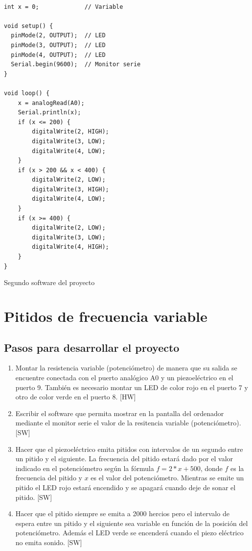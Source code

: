 \documentclass[11pt,spanish,a4paper]{article}
\begin{document}
\begin{listing}[H]
\begin{verbatim}

int x = 0;             // Variable

void setup() {
  pinMode(2, OUTPUT);  // LED
  pinMode(3, OUTPUT);  // LED
  pinMode(4, OUTPUT);  // LED
  Serial.begin(9600);  // Monitor serie
}

void loop() {
	x = analogRead(A0);
	Serial.println(x);
	if (x <= 200) {
		digitalWrite(2, HIGH);
		digitalWrite(3, LOW);
		digitalWrite(4, LOW);
	}
	if (x > 200 && x < 400) {
		digitalWrite(2, LOW);
		digitalWrite(3, HIGH);
		digitalWrite(4, LOW);
	}
	if (x >= 400) {
		digitalWrite(2, LOW);
		digitalWrite(3, LOW);
		digitalWrite(4, HIGH);
	}
}
\end{verbatim}
	\caption{Segundo software del proyecto \thesection}
\end{listing}

\newpage
\section{Pitidos de frecuencia variable}

\subsection{Pasos para desarrollar el proyecto}
\begin{enumerate}
	\item Montar la resistencia variable (potenciómetro) de manera que su salida se encuentre conectada con el
		puerto analógico A0 y un piezoeléctrico en el puerto 9. También es necesario montar un LED
		de color rojo en el puerto 7 y otro de color verde en el puerto 8. [HW]
	\item Escribir el software que permita mostrar en la pantalla del ordenador mediante el monitor
		serie el valor de la resitencia variable (potenciómetro). [SW]
	\item Hacer que el piezoeléctrico emita pitidos con intervalos de un segundo entre un pitido y
		el siguiente. La frecuencia del pitido estará dado por el valor indicado en el
		potenciómetro según la fórmula $f=2*x+500$, donde $f$ es la frecuencia del pitido y $x$ es el
		valor del potenciómetro. Mientras se emite un pitido el LED rojo estará encendido y se
		apagará cuando deje de sonar el pitido. [SW]
	\item Hacer que el pitido siempre se emita a 2000 hercios pero el intervalo de espera entre un
		pitido y el siguiente sea variable en función de la posición del potenciómetro. Además el
		LED verde se encenderá cuando el piezo eléctrico no emita sonido. [SW]
\end{enumerate}
\end{document}
